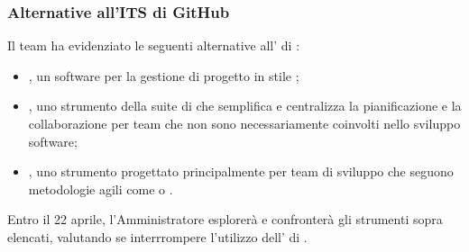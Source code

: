 \newpage
\subsubsection{Alternative all'ITS di GitHub}
\par Il team ha evidenziato le seguenti alternative all' di :
\begin{itemize}
  \item {}, un software per la gestione di progetto in stile ;
  \item {}, uno strumento della suite di  che semplifica e centralizza la pianificazione e la collaborazione per team che non sono necessariamente coinvolti nello sviluppo software;
  \item {}, uno strumento progettato principalmente per team di sviluppo che seguono metodologie agili come  o .
\end{itemize}

\vspace{0.5\baselineskip}
\par Entro il 22 aprile, l'Amministratore esplorerà e confronterà gli strumenti sopra elencati, valutando se interrrompere l'utilizzo dell' di .